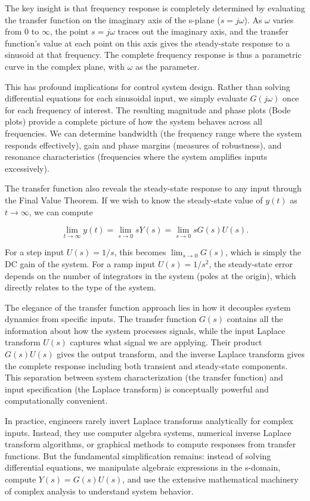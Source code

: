 The key insight is that frequency response is completely determined by evaluating the transfer function on the imaginary axis of the s-plane ($s = j\omega$). As $\omega$ varies from 0 to $\infty$, the point $s = j\omega$ traces out the imaginary axis, and the transfer function's value at each point on this axis gives the steady-state response to a sinusoid at that frequency. The complete frequency response is thus a parametric curve in the complex plane, with $\omega$ as the parameter.

This has profound implications for control system design. Rather than solving differential equations for each sinusoidal input, we simply evaluate $G(j\omega)$ once for each frequency of interest. The resulting magnitude and phase plots (Bode plots) provide a complete picture of how the system behaves across all frequencies. We can determine bandwidth (the frequency range where the system responds effectively), gain and phase margins (measures of robustness), and resonance characteristics (frequencies where the system amplifies inputs excessively).

The transfer function also reveals the steady-state response to any input through the Final Value Theorem. If we wish to know the steady-state value of $y(t)$ as $t \to \infty$, we can compute

\[
\lim_{t \to \infty} y(t) = \lim_{s \to 0} s Y(s) = \lim_{s \to 0} s G(s) U(s).
\]

For a step input $U(s) = 1/s$, this becomes $\lim_{s \to 0} G(s)$, which is simply the DC gain of the system. For a ramp input $U(s) = 1/s^2$, the steady-state error depends on the number of integrators in the system (poles at the origin), which directly relates to the type of the system.

The elegance of the transfer function approach lies in how it decouples system dynamics from specific inputs. The transfer function $G(s)$ contains all the information about how the system processes signals, while the input Laplace transform $U(s)$ captures what signal we are applying. Their product $G(s)U(s)$ gives the output transform, and the inverse Laplace transform gives the complete response including both transient and steady-state components. This separation between system characterization (the transfer function) and input specification (the Laplace transform) is conceptually powerful and computationally convenient.

In practice, engineers rarely invert Laplace transforms analytically for complex inputs. Instead, they use computer algebra systems, numerical inverse Laplace transform algorithms, or graphical methods to compute responses from transfer functions. But the fundamental simplification remains: instead of solving differential equations, we manipulate algebraic expressions in the s-domain, compute $Y(s) = G(s)U(s)$, and use the extensive mathematical machinery of complex analysis to understand system behavior.


